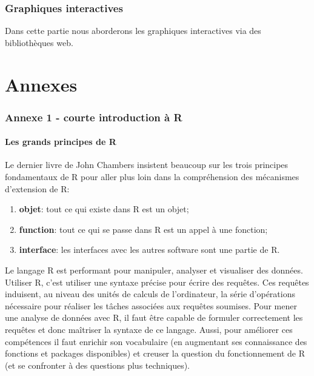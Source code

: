 \documentclass[]{article}
\providecommand{\tightlist}{%
  \setlength{\itemsep}{0pt}\setlength{\parskip}{0pt}}
\begin{document}
\hypertarget{graphiques-interactives}{%
\section{Graphiques interactives}\label{graphiques-interactives}}

Dans cette partie nous aborderons les graphiques interactives via des bibliothèques web.

\hypertarget{part-annexes}{%
\part{Annexes}\label{part-annexes}}

\hypertarget{annexe-1---courte-introduction-uxe0-r}{%
\section{Annexe 1 - courte introduction à R}\label{annexe-1---courte-introduction-uxe0-r}}

\hypertarget{les-grands-principes-de-r}{%
\subsection{Les grands principes de R}\label{les-grands-principes-de-r}}

Le dernier livre de John Chambers \citep{chambers_extending_2016} insistent beaucoup
sur les trois principes fondamentaux de R pour aller plus loin dans
la compréhension des mécanismes d'extension de R:

\begin{enumerate}
\def\labelenumi{\arabic{enumi}.}
\tightlist
\item
  \textbf{objet}: tout ce qui existe dans R est un objet;
\item
  \textbf{function}: tout ce qui se passe dans R est un appel à une fonction;
\item
  \textbf{interface}: les interfaces avec les autres software sont une partie de R.
\end{enumerate}

Le langage R est performant pour manipuler, analyser et visualiser des données.
Utiliser R, c'est utiliser une syntaxe précise pour écrire des requêtes. Ces
requêtes induisent, au niveau des unités de calculs de l'ordinateur, la série
d'opérations nécessaire pour réaliser les tâches associées aux requêtes soumises.
Pour mener une analyse de données avec R, il faut être capable de formuler
correctement les requêtes et donc maîtriser la syntaxe de ce langage. Aussi,
pour améliorer ces compétences il faut enrichir son vocabulaire (en augmentant
ses connaissance des fonctions et packages disponibles) et creuser la question
du fonctionnement de R (et se confronter à des questions plus techniques).
\end{document}

